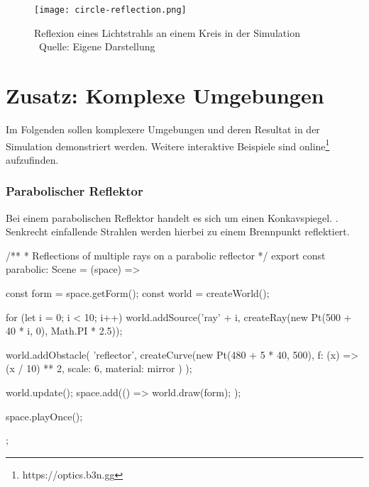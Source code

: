 
\begin{figure}
    \centering
    \texttt{[image: circle-reflection.png]}

    \caption{Reflexion eines Lichtstrahls an einem Kreis in der Simulation  \\ Quelle: Eigene Darstellung}

\end{figure}

\chapter*{Zusatz: Komplexe Umgebungen}
Im Folgenden sollen komplexere Umgebungen und deren Resultat in der Simulation demonstriert werden. 
Weitere interaktive Beispiele sind online\footnote{https://optics.b3n.gg} aufzufinden.
\newpage
\subsection*{Parabolischer Reflektor}
Bei einem parabolischen Reflektor handelt es sich um einen Konkavspiegel. \parencite[vgl.][S. 362]{kuchling2004taschenbuch}.
Senkrecht einfallende Strahlen werden hierbei zu einem Brennpunkt reflektiert. 

\begin{verbnobox}[\scriptsize\mbox{}]
/**
* Reflections of multiple rays on a parabolic reflector
*/
export const parabolic: Scene = (space) => {
    const form = space.getForm();
    const world = createWorld();

    for (let i = 0; i < 10; i++) {
        world.addSource('ray' + i, createRay(new Pt(500 + 40 * i, 0), Math.PI * 2.5));
    }

    world.addObstacle(
        'reflector',
        createCurve(new Pt(480 + 5 * 40, 500), { f: (x) => (x / 10) ** 2, scale: 6, material: mirror })
    );

    world.update();
    space.add(() => {
        world.draw(form);
    });

    space.playOnce();
};
\end{verbnobox}

